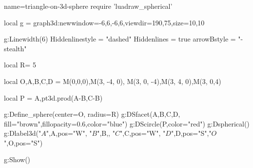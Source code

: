 \documentclass{standalone}
\begin{document}
\begin{luadraw}{name=triangle-on-3d-sphere}
require 'luadraw_spherical'

local g = graph3d:new{window={-6,6,-6,6},viewdir={190,75},size={10,10}}

g:Linewidth(6)
Hiddenlinestyle = "dashed"
Hiddenlines = true
arrowBstyle = "-stealth"

local R= 5

local O,A,B,C,D = M(0,0,0),M(3, -4, 0), M(3, 0, -4),M(3, 4, 0),M(3, 0,4)

local P = {A,pt3d.prod(A-B,C-B)}

g:Define_sphere({center=O, radius=R})
g:DSfacet({A,B,C,D}, {fill="brown",fillopacity=0.6,color="blue"})
g:DScircle(P,{color="red"})
g:Dspherical()
g:Dlabel3d("$A$",A,{pos="W"}, "$B$",B,{}, "$C$",C,{pos="W"}, "$D$",D,{pos="S"},"$O$",O,{pos="S"})

g:Show()
\end{luadraw}
\end{document}
